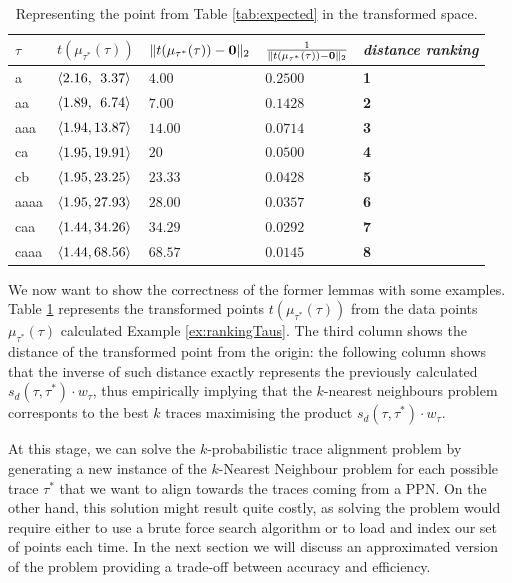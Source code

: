 \begin{table}[!t]
\centering
\caption{Representing the point from Table \ref{tab:expected} in the transformed space.}\label{tab:transf}
\begin{tabular}{ll|lll}
	\toprule
	
	$\tau$ & $t(\mu_{\tau^*}(\tau))$ & $\norm{t(\mu_{\tau^*}(\tau))-\vec{0}}{2}$ & $\frac{1}{\norm{t(\mu_{\tau^*}(\tau))-\vec{0}}{2}}$ & \textit{distance ranking}\\
	
	\midrule	
	a   & $\braket{2.16, \;\,3.37}$ & $4.00$ & $0.2500$ & \textbf{1}\\
	{aa}  & $\braket{1.89, \;\,6.74}$ & $7.00$ & $0.1428$ & \textbf{2}\\
	aaa   & $\braket{1.94, 13.87}$ & $14.00$ & $0.0714$ & \textbf{3}\\
	ca   & $\braket{1.95, 19.91}$ & $20$ & $0.0500$ & \textbf{4}\\
	{cb}  & $\braket{1.95, 23.25}$ & $23.33$ & $0.0428$ & \textbf{5}\\
aaaa   & $\braket{1.95, 27.93}$ & $28.00$ & $0.0357$ & \textbf{6}\\
caa   & $\braket{1.44, 34.26}$ & $34.29$ & $0.0292$ & \textbf{7}\\
caaa   & $\braket{1.44, 68.56}$ & $68.57$ & $0.0145$ & \textbf{8}\\
	\bottomrule
\end{tabular}
\end{table}
\begin{example}
We now want to show the correctness of the former lemmas with some examples. 
Table \ref{tab:transf} represents the transformed points $t(\mu_{\tau^*}(\tau))$ from the data points $\mu_{\tau^*}(\tau)$  calculated  Example \ref{ex:rankingTaus}. The third column shows the distance of the transformed point from the origin: the following column shows that the inverse of such distance exactly represents the previously calculated $s_d(\tau,\tau^*)\cdot w_\tau$, thus empirically implying that the $k$-nearest neighbours problem corresponts to the best $k$ traces maximising the product $s_d(\tau,\tau^*)\cdot w_\tau$.
\end{example}





At this stage, we can solve the $k$-probabilistic trace alignment problem by generating a new instance of the $k$-Nearest Neighbour problem for each possible trace $\tau^*$ that we want to align towards the traces coming from a PPN. On the other hand, this solution might result quite costly, as solving the problem would require either to use a brute force search algorithm or to load and index our set of points each time. In the next section we will discuss an approximated version of the problem providing a trade-off between accuracy and efficiency.


